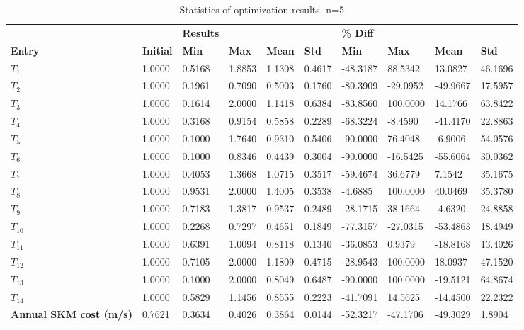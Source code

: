 \begin{table}[H]
\centering
\begin{tabular}{llllllllll}
\textbf{} & \textbf{} & \cellcolor[HTML]{EFEFEF}\textbf{Results} & \cellcolor[HTML]{EFEFEF} & \cellcolor[HTML]{EFEFEF} & \cellcolor[HTML]{EFEFEF} & \cellcolor[HTML]{EFEFEF}\textbf{\% Diff} & \cellcolor[HTML]{EFEFEF} & \cellcolor[HTML]{EFEFEF} & \cellcolor[HTML]{EFEFEF} \\
\rowcolor[HTML]{EFEFEF} 
\textbf{Entry} & \textbf{Initial} & \textbf{Min} & \textbf{Max} & \textbf{Mean} & \textbf{Std} & \textbf{Min} & \textbf{Max} & \textbf{Mean} & \textbf{Std} \\
$T_{1}$ & 1.0000 & 0.5168 & 1.8853 & 1.1308 & 0.4617 & -48.3187 & 88.5342 & 13.0827 & 46.1696 \\ 
$T_{2}$ & 1.0000 & 0.1961 & 0.7090 & 0.5003 & 0.1760 & -80.3909 & -29.0952 & -49.9667 & 17.5957 \\ 
$T_{3}$ & 1.0000 & 0.1614 & 2.0000 & 1.1418 & 0.6384 & -83.8560 & 100.0000 & 14.1766 & 63.8422 \\ 
$T_{4}$ & 1.0000 & 0.3168 & 0.9154 & 0.5858 & 0.2289 & -68.3224 & -8.4590 & -41.4170 & 22.8863 \\ 
$T_{5}$ & 1.0000 & 0.1000 & 1.7640 & 0.9310 & 0.5406 & -90.0000 & 76.4048 & -6.9006 & 54.0576 \\ 
$T_{6}$ & 1.0000 & 0.1000 & 0.8346 & 0.4439 & 0.3004 & -90.0000 & -16.5425 & -55.6064 & 30.0362 \\ 
$T_{7}$ & 1.0000 & 0.4053 & 1.3668 & 1.0715 & 0.3517 & -59.4674 & 36.6779 & 7.1542 & 35.1675 \\ 
$T_{8}$ & 1.0000 & 0.9531 & 2.0000 & 1.4005 & 0.3538 & -4.6885 & 100.0000 & 40.0469 & 35.3780 \\ 
$T_{9}$ & 1.0000 & 0.7183 & 1.3817 & 0.9537 & 0.2489 & -28.1715 & 38.1664 & -4.6320 & 24.8858 \\ 
$T_{10}$ & 1.0000 & 0.2268 & 0.7297 & 0.4651 & 0.1849 & -77.3157 & -27.0315 & -53.4863 & 18.4949 \\ 
$T_{11}$ & 1.0000 & 0.6391 & 1.0094 & 0.8118 & 0.1340 & -36.0853 & 0.9379 & -18.8168 & 13.4026 \\ 
$T_{12}$ & 1.0000 & 0.7105 & 2.0000 & 1.1809 & 0.4715 & -28.9543 & 100.0000 & 18.0937 & 47.1520 \\ 
$T_{13}$ & 1.0000 & 0.1000 & 2.0000 & 0.8049 & 0.6487 & -90.0000 & 100.0000 & -19.5121 & 64.8674 \\ 
$T_{14}$ & 1.0000 & 0.5829 & 1.1456 & 0.8555 & 0.2223 & -41.7091 & 14.5625 & -14.4500 & 22.2322 \\ 
\rowcolor[HTML]{EFEFEF} 
\textbf{Annual SKM cost (m/s)} & 0.7621 & 0.3634 & 0.4026 & 0.3864 & 0.0144 & -52.3217 & -47.1706 & -49.3029 & 1.8904 \\ 
\end{tabular}
\caption{Statistics of optimization results. n=5}
\label{tab:StatisticsOptimizationAnalysis}
\end{table}